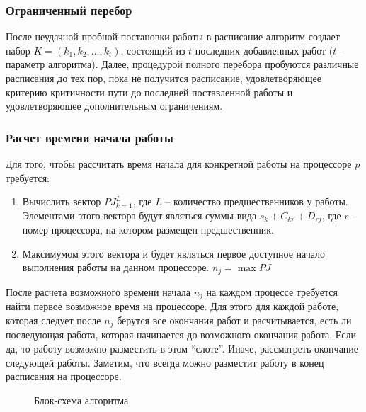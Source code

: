 \subsubsection*{Ограниченный перебор}
После неудачной пробной постановки работы в расписание алгоритм создает набор $K = \left( k_1, k_2, \dots, k_t \right)$, состоящий из $t$ последних добавленных работ ($t$ – параметр алгоритма). Далее, процедурой полного перебора пробуются различные расписания до тех пор, пока не получится расписание, удовлетворяющее критерию критичности пути до последней поставленной работы и удовлетворяющее дополнительным ограничениям.
\subsubsection*{Расчет времени начала работы}
Для того, чтобы рассчитать время начала  для конкретной работы на процессоре $p$ требуется:
\begin{enumerate}
    \item Вычислить вектор $PJ_{k=1}^L$, где $L$ – количество предшественников у работы. Элементами этого вектора будут являться суммы вида $s_k + C_{kr} + D_{rj}$, где $r$ – номер процессора, на котором размещен предшественник.
    \item Максимумом этого вектора и будет являться первое доступное начало выполнения работы на данном процессоре. $n_j=\max{PJ}$
\end{enumerate}

После расчета возможного времени начала $n_j$ на каждом процессе требуется найти первое возможное время на процессоре. Для этого для каждой работе, которая следует после $n_j$ берутся все окончания работ и расчитывается, есть ли последующая работа, которая начинается до возможного окончания работа. Если да, то работу возможно разместить в этом “слоте”. Иначе, рассматреть окончание следующей работы. Заметим, что всегда можно разместит работу в конец расписания на процессоре.
{\small
\begin{figure}
    \label{fig:block-scheme}
    \caption{Блок-схема алгоритма}
\end{figure}
}